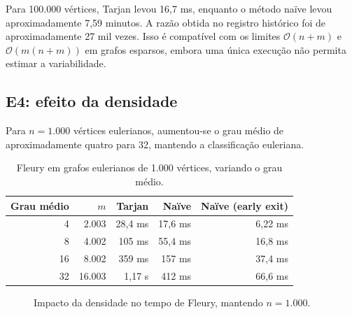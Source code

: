 \documentclass[12pt,a4paper]{article}
\newcommand{\ordem}[1]{\mathcal{O}\!\left(#1\right)}
\newcommand{\naive}{na\"ive}
\begin{document}
Para 100.000 vértices, Tarjan levou 16,7 ms, enquanto o método
\naive{} levou aproximadamente 7,59 minutos. A razão obtida no
registro histórico foi de aproximadamente 27 mil vezes. Isso é
compatível com os limites $\ordem{n+m}$ e $\ordem{m(n+m)}$ em grafos
esparsos, embora uma única execução não permita estimar a variabilidade.

\subsection{E4: efeito da densidade}
Para $n=1.000$ vértices eulerianos, aumentou-se o grau médio de
aproximadamente quatro para 32, mantendo a classificação euleriana.

\begin{table}[H]
\centering\small
\caption{Fleury em grafos eulerianos de 1.000 vértices, variando o grau médio.}
\label{tab:densidade}
\begin{tabular}{@{}rrrrr@{}}
\toprule
Grau médio & $m$ & Tarjan & Naïve & Naïve (early exit) \\
\midrule
4 & 2.003 & 28,4 ms & 17,6 ms & 6,22 ms \\
8 & 4.002 & 105 ms & 55,4 ms & 16,8 ms \\
16 & 8.002 & 359 ms & 157 ms & 37,4 ms \\
32 & 16.003 & 1,17 s & 412 ms & 66,6 ms \\
\bottomrule
\end{tabular}
\end{table}

\begin{figure}[H]
\centering
{}
\caption{Impacto da densidade no tempo de Fleury, mantendo $n=1.000$.}
\label{fig:densidade}
\end{figure}
\end{document}
